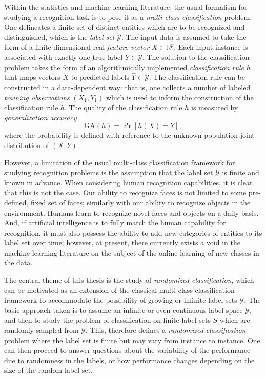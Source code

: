 \documentclass[12pt]{article}
\begin{document}
Within the statistics and machine learning literature, the usual
formalism for studying a recognition task is to pose it as a
\emph{multi-class classification} problem.  One delineates a finite
set of distinct entities which are to be recognized and distinguished,
which is the \emph{label set} $\mathcal{Y}$.  The input data is
assumed to take the form of a finite-dimensional real \emph{feature
  vector} $X \in \mathbb{R}^p$.  Each input instance is associated
with exactly one true label $Y \in \mathcal{Y}$.  The solution to the
classification problem takes the form of an algorithmically
implemented \emph{classification rule} $h$ that maps vectors $X$ to
predicted labels $\hat{Y} \in \mathcal{Y}$.  The classification rule
can be constructed in a data-dependent way: that is, one collects a
number of labeled \emph{training observations} $(X_1, Y_1)$ which is
used to inform the construction of the classification rule $h$.  The
quality of the classification rule $h$ is measured by \emph{generalization accuracy}
\[
\text{GA}(h) = \Pr[h(X) = Y],
\]
where the probability is defined with reference to the unknown
population joint distribution of $(X, Y)$.  

However, a limitation of the usual multi-class classification
framework for studying recognition problems is the assumption that the
label set $\mathcal{Y}$ is finite and known in advance.  When
considering human recognition capabilities, it is clear that this is
not the case.  Our ability to recognize faces is not limited to some
pre-defined, fixed set of faces; similarly with our ability to recognize
objects in the environment.  Humans learn to recognize novel faces and
objects on a daily basis.  And, if artificial intelligence is to fully
match the human capability for recognition, it must also possess the
ability to add new categories of entities to its label set over time;
however, at present, there currently exists a void in the machine
learning literature on the subject of the online learning of new
classes in the data.

The central theme of this thesis is the study of \emph{randomized
  classification}, which can be motivated as an extension of the
classical multi-class classification framework to accommodate the
possibility of growing or infinite label sets $\mathcal{Y}$. The basic
approach taken is to assume an infinite or even continuous label space
$\mathcal{Y}$, and then to study the problem of classification on
finite label sets $S$ which are randomly sampled from $\mathcal{Y}.$
This, therefore defines a \emph{randomized classification} problem
where the label set is finite but may vary from instance to instance.
One can then proceed to answer questions about the variability of the
performance due to randomness in the labels, or how performance
changes depending on the size of the random label set.
\end{document}
